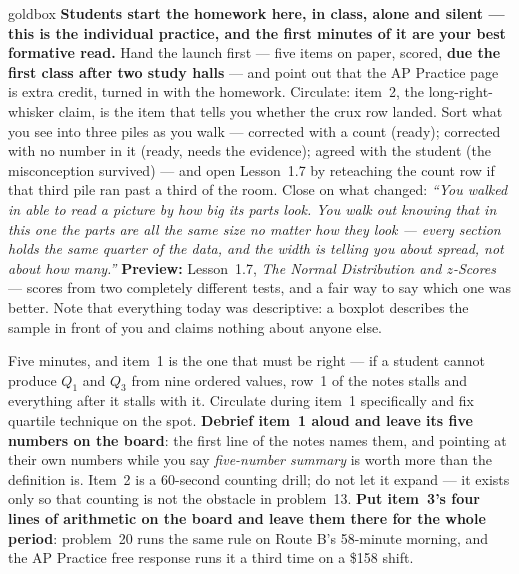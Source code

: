 \documentclass[10pt]{article}
\begin{document}
\boxguard
\begin{skillbox}{goldbox}
\textbf{Students start the homework here, in class, alone and silent --- this is the individual
practice, and the first minutes of it are your best formative read.} Hand the launch first ---
five items on paper, scored, \textbf{due the first class after two study halls} --- and point out
that the AP Practice page is extra credit, turned in with the homework. Circulate: item~2, the long-right-whisker
claim, is the item that tells you whether the crux row landed. Sort what you see into three piles
as you walk --- corrected with a count (ready); corrected with no number in it (ready, needs the
evidence); agreed with the student (the misconception survived) --- and open Lesson~1.7 by
reteaching the count row if that third pile ran past a third of the room. Close on what changed:
\emph{``You walked in able to read a picture by how big its parts look. You walk out knowing that
in this one the parts are all the same size no matter how they look --- every section holds the
same quarter of the data, and the width is telling you about spread, not about how many.''}
\textbf{Preview:} Lesson~1.7, \emph{The Normal Distribution and $z$-Scores} --- scores from two
completely different tests, and a fair way to say which one was better. Note that everything today
was descriptive: a boxplot describes the sample in front of you and claims nothing about anyone
else.
\end{skillbox}

\begin{teachernote}[Warm-Up]
Five minutes, and item~1 is the one that must be right --- if a student cannot produce $Q_1$ and
$Q_3$ from nine ordered values, row~1 of the notes stalls and everything after it stalls with it.
Circulate during item~1 specifically and fix quartile technique on the spot. \textbf{Debrief
item~1 aloud and leave its five numbers on the board}: the first line of the notes names them,
and pointing at their own numbers while you say \emph{five-number summary} is worth more than the
definition is. Item~2 is a 60-second counting drill; do not let it expand --- it exists only so
that counting is not the obstacle in problem~13. \textbf{Put item~3's four lines of arithmetic on
the board and leave them there for the whole period}: problem~20 runs the same rule on Route B's
58-minute morning, and the AP Practice free response runs it a third time on a \$158 shift.
\end{teachernote}
\end{document}
